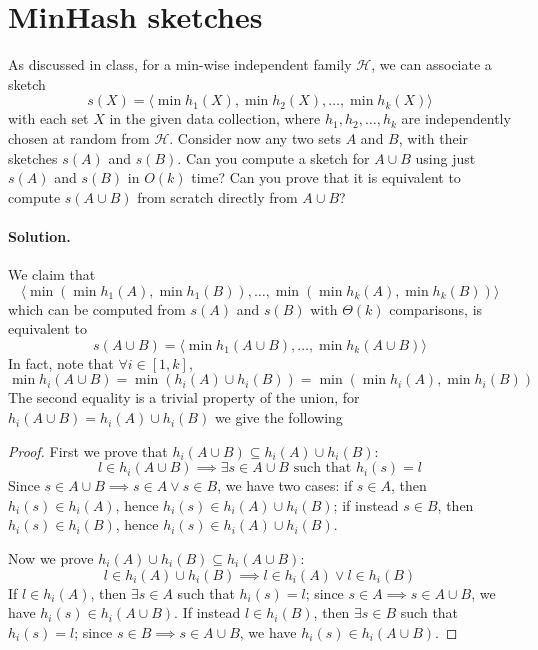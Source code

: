 \section{MinHash sketches}

As discussed in class, for a min-wise independent family $\mathcal{H}$, we can associate a sketch $$s(X) = \langle \min h_1(X), \min h_2(X), \dots , \min h_k(X) \rangle$$ with each set $X$ in the given data collection, where $h_1, h_2, \dots , h_k$ are independently chosen at random from $\mathcal{H}$. Consider now any two sets $A$ and $B$, with their sketches $s(A)$ and $s(B)$. Can you compute a sketch for $A \cup B$ using just $s(A)$ and $s(B)$ in $O(k)$ time? Can you prove that it is equivalent to compute $s(A \cup B)$ from scratch directly from $A \cup B$?

\vspace{0.5cm}
\paragraph{Solution.}  We claim that
$$\langle \min(\min h_1(A), \min h_1(B)), \dots, \min(\min h_k(A), \min h_k(B))\rangle$$
which can be computed from $s(A)$ and $s(B)$ with $\Theta(k)$ comparisons, is equivalent to
$$s(A \cup B) = \langle \min h_1(A \cup B), \dots , \min h_k(A \cup B) \rangle$$
In fact, note that $\forall i \in [1, k]$, $$\min h_i(A \cup B) = \min (h_i(A) \cup h_i(B)) = \min ( \min h_i(A), \min h_i(B))$$
The second equality is a trivial property of the union, for $h_i(A \cup B) = h_i(A) \cup h_i(B)$ we give the following
\begin{proof}
  First we prove that $h_i(A \cup B) \subseteq h_i(A) \cup h_i(B)$:
  $$l \in h_i(A \cup B) \implies \exists s \in A \cup B \text{ such that } h_i(s) = l$$
 Since $s \in A \cup B \implies s \in A \vee s \in B$, we have two cases: if $s\in A$, then $h_i(s) \in h_i(A)$, hence $ h_i(s) \in h_i(A)\cup h_i(B)$; if instead $s\in B$, then $h_i(s) \in h_i(B) $, hence $ h_i(s) \in h_i(A)\cup h_i(B)$.

  Now we prove $h_i(A) \cup h_i(B) \subseteq h_i(A \cup B)$:
  $$l \in h_i(A) \cup h_i(B) \implies l \in h_i(A) \vee l \in h_i(B)$$
  If $l \in h_i(A)$, then $\exists s \in A$ such that $h_i(s)=l$; since $s \in A \implies s \in A \cup B$, we have $h_i(s) \in h_i(A \cup B)$. If instead $l \in h_i(B)$, then $\exists s \in B$ such that $h_i(s)=l$; since $s \in B \implies s \in A \cup B$, we have $h_i(s) \in h_i(A \cup B)$.
\end{proof}